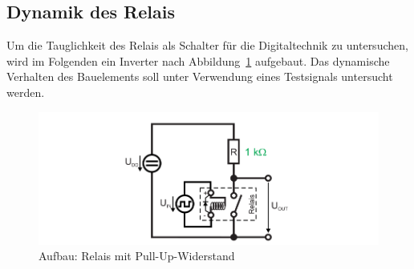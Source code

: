 \documentclass[10pt]{scrreprt}
\begin{document}
    \subsection{Dynamik des Relais}
    Um die Tauglichkeit des Relais als Schalter für die Digitaltechnik zu untersuchen, wird
    im Folgenden ein Inverter nach Abbildung~\ref{fig:abb12} aufgebaut. Das dynamische Verhalten des
    Bauelements soll unter Verwendung eines Testsignals untersucht werden.

    \begin{figure}[H]
        \includegraphics[width=\textwidth]{abb12.png}
        \caption{Aufbau: Relais mit Pull-Up-Widerstand}
        \label{fig:abb12}
    \end{figure}
\end{document}
